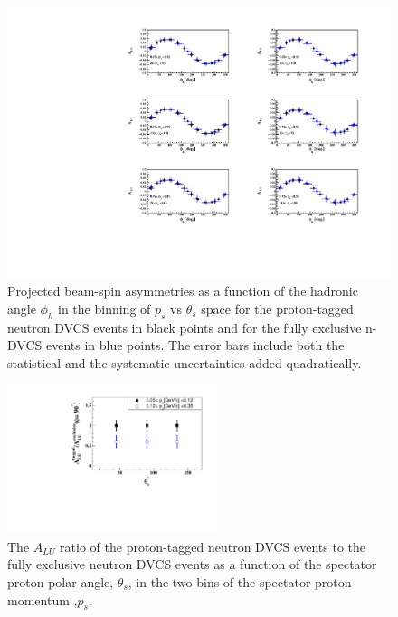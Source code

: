 \begin{figure}[htb]
  \centering
    \includegraphics[width=1.1\textwidth,clip]{figs_epngamma/pdf/epngamma_BSA_incoherent_Phi.pdf}
  \caption{Projected beam-spin asymmetries as a function of the hadronic angle 
   $\phi_h$ in the binning of $p_s$ vs $\theta_s$ space for the proton-tagged 
   neutron DVCS events in black points and for the fully exclusive n-DVCS 
   events in blue points. The error bars include both the statistical and the 
   systematic uncertainties added quadratically.
   \label{fig:alu_exclusive}}
\end{figure}

\begin{figure}[htb]
  \centering
\includegraphics[width=0.55\textwidth,clip,trim=0mm 0mm 0mm 
   0mm]{figs_epngamma/pdf/ALU_ratio.pdf}
  \caption{The $A_{LU}$ ratio of the proton-tagged neutron DVCS events to the 
   fully exclusive neutron DVCS events as a function of the spectator proton 
   polar angle, $\theta_s$, in the two bins of the spectator proton momentum 
   ,$p_s$.
   \label{fig:alu_ratio}}
\end{figure}



